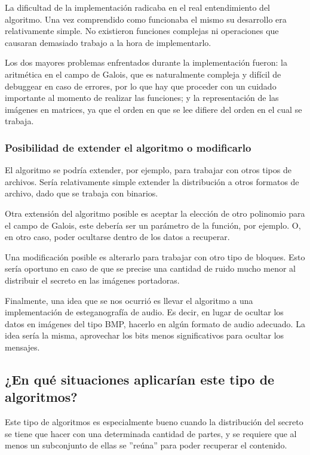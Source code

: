 \documentclass[11pt]{scrartcl} %
\begin{document}
La dificultad de la implementación radicaba en el real entendimiento del algoritmo. Una vez comprendido como funcionaba el mismo su desarrollo era relativamente simple. No existieron funciones complejas ni operaciones que causaran demasiado trabajo a la hora de implementarlo.

Los dos mayores problemas enfrentados durante la implementación fueron: la aritmética en el campo de Galois, que es naturalmente compleja y difícil de debuggear en caso de errores, por lo que hay que proceder con un cuidado importante al momento de realizar las funciones; y la representación de las imágenes en matrices, ya que el orden en que se lee difiere del orden en el cual se trabaja.

\subsubsection{Posibilidad de extender el algoritmo o modificarlo}

El algoritmo se podría extender, por ejemplo, para trabajar con otros tipos de archivos. Sería relativamente simple extender la distribución a otros formatos de archivo, dado que se trabaja con binarios.

Otra extensión del algoritmo posible es aceptar la elección de otro polinomio para el campo de Galois, este debería ser un parámetro de la función, por ejemplo. O, en otro caso, poder ocultarse dentro de los datos a recuperar.

Una modificación posible es alterarlo para trabajar con otro tipo de bloques. Esto sería oportuno en caso de que se precise una cantidad de ruido mucho menor al distribuir el secreto en las imágenes portadoras.

Finalmente, una idea que se nos ocurrió es llevar el algoritmo a una implementación de esteganografía de audio. Es decir, en lugar de ocultar los datos en imágenes del tipo BMP, hacerlo en algún formato de audio adecuado. La idea sería la misma, aprovechar los bits menos significativos para ocultar los mensajes.

\subsection{¿En qué situaciones aplicarían este tipo de algoritmos?}

Este tipo de algoritmos es especialmente bueno cuando la distribución del secreto se tiene que hacer con una determinada cantidad de partes, y se requiere que al menos un subconjunto de ellas se ''reúna'' para poder recuperar el contenido.
\end{document}
